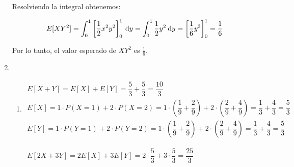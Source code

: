\begin{enumerate}[label=\color{red}\arabic*), leftmargin=*]
	Resolviendo la integral obtenemos:
	
	$$E[XY^2] = \int_{0}^{1} \left[ \frac{1}{2}x^2y^2 \right]_{0}^{1} \:\mathrm{d}y = \int_{0}^{1} \frac{1}{2}y^2 \:\mathrm{d}y = \left[ \frac{1}{6}y^3 \right]_{0}^{1} = \frac{1}{6}$$
	
	Por lo tanto, el valor esperado de $XY^2$ es $\frac{1}{6}$.
	\item {}
	\begin{enumerate}[label=\color{red}\alph*)]
		\item {}
		
		$\begin{array}{l}
		E[X+Y]=E[X]+E[Y]=\dfrac{5}{3}+\dfrac{5}{3}=\dfrac{10}{3}\\
		E[X]=1\cdot P(X=1)+2\cdot P(X=2)=1\cdot\left(\dfrac{1}{9}+\dfrac{2}{9}\right)+2\cdot\left(\dfrac{2}{9}+\dfrac{4}{9}\right)=\dfrac{1}{3}+\dfrac{4}{3}=\dfrac{5}{3}\\
		E[Y]=1\cdot P(Y=1)+2\cdot P(Y=2)=1\cdot\left(\dfrac{1}{9}+\dfrac{2}{9}\right)+2\cdot\left(\dfrac{2}{9}+\dfrac{4}{9}\right)=\dfrac{1}{3}+\dfrac{4}{3}=\dfrac{5}{3}
		\end{array}$
		
		$\begin{array}{l}
		E[2X+3Y]=2E[X]+3E[Y]=2\cdot\dfrac{5}{3}+3\cdot\dfrac{5}{3}=\dfrac{25}{3}
		\end{array}$
		

\end{enumerate}
\end{enumerate}
